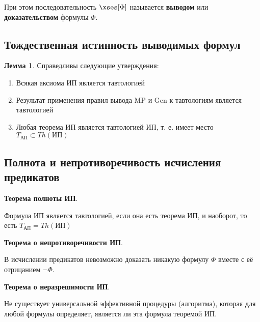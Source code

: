 При этом последовательность $\xses[\Phi]$ называется \textbf{выводом} или \textbf{доказательством} формулы $\Phi$.

\subsection{Тождественная истинность выводимых формул}
\textbf{Лемма 1}. Справедливы следующие утверждения:
\begin{enumerate}
    \item Всякая аксиома ИП является тавтологией
    \item Результат применения правил вывода MP и Gen к тавтологиям является тавтологией
    \item Любая теорема ИП является тавтологией ИП, т. е. имеет место $T_{\text{АП}} \subset Th(\text{ИП})$
\end{enumerate}

\subsection{Полнота и непротиворечивость исчисления предикатов}
\textbf{Теорема полноты ИП}.

Формула ИП является тавтологией, если она есть теорема ИП, и наоборот, то есть $T_{\text{АП}} = Th(\text{ИП})$

\textbf{Теорема о непротиворечивости ИП}.

В исчислении предикатов невозможно доказать никакую формулу $\Phi$ вместе с её отрицанием $\lnot \Phi$.

\textbf{Теорема о неразрешимости ИП}.

Не существует универсальной эффективной процедуры (алгоритма), которая для любой формулы определяет, является ли эта формула теоремой ИП.